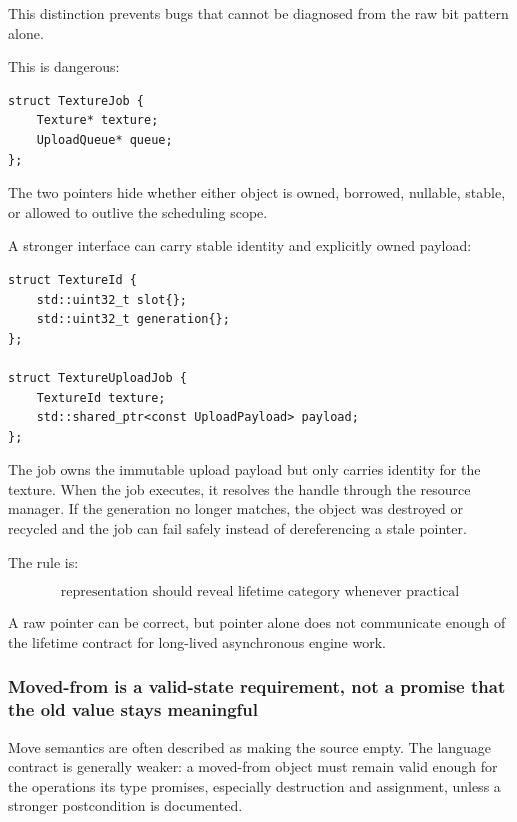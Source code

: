 This distinction prevents bugs that cannot be diagnosed from the raw bit pattern alone.

This is dangerous:

\begin{verbatim}
struct TextureJob {
    Texture* texture;
    UploadQueue* queue;
};
\end{verbatim}

The two pointers hide whether either object is owned, borrowed, nullable, stable, or allowed to outlive the scheduling scope.

A stronger interface can carry stable identity and explicitly owned payload:

\begin{verbatim}
struct TextureId {
    std::uint32_t slot{};
    std::uint32_t generation{};
};

struct TextureUploadJob {
    TextureId texture;
    std::shared_ptr<const UploadPayload> payload;
};
\end{verbatim}

The job owns the immutable upload payload but only carries identity for the texture. When the job executes, it resolves the handle through the resource manager. If the generation no longer matches, the object was destroyed or recycled and the job can fail safely instead of dereferencing a stale pointer.

The rule is:

\[
\boxed{
\text{representation should reveal lifetime category whenever practical}
}
\]

A raw pointer can be correct, but pointer alone does not communicate enough of the lifetime contract for long-lived asynchronous engine work.

\subsubsection{Moved-from is a valid-state requirement, not a promise that the old value stays meaningful}\label{01-foundations-i-ch005-moved-from-is-a-valid-state-requirement-not-a-promise-that-the-old-value-stays-meaningful}

\hypertarget{01-foundations-i-ch005-moved-from-is-a-valid-state-requirement-not-a-promise-that-the-old-value-stays-meaningful}{}

Move semantics are often described as making the source empty. The language contract is generally weaker: a moved-from object must remain valid enough for the operations its type promises, especially destruction and assignment, unless a stronger postcondition is documented.

